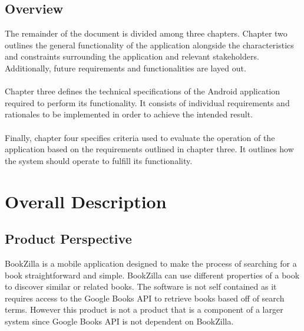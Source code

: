 \documentclass[12pt]{article}
\begin{document}
    \subsection{Overview}
    \label{sub:overview}
    The remainder of the document is divided among three chapters. Chapter two outlines the general functionality of the application alongside the characteristics and constraints surrounding the application and relevant stakeholders. Additionally, future requirements and functionalities are layed out. \\ ~ \\
    Chapter three defines the technical specifications of the Android application required to perform its functionality. It consists of individual requirements and rationales to be implemented in order to achieve the intended result. \\ ~ \\
    Finally, chapter four specifies criteria used to evaluate the operation of the application based on the requirements outlined in chapter three. It outlines how the system should operate to fulfill its functionality.
    
    
    \section{Overall Description}
    \label{sec:overall_description}
    
    
    \subsection{Product Perspective}
    \label{sub:product_perspective}
    
    BookZilla is a mobile application designed to make the process of searching for a book straightforward and simple. BookZilla can use different properties of a book to discover similar or related books. The software is not self contained as it requires access to the Google Books API to retrieve books based off of search terms. However this product is not a product that is a component of a larger system since Google Books API is not dependent on BookZilla.
    
    
\end{document}
